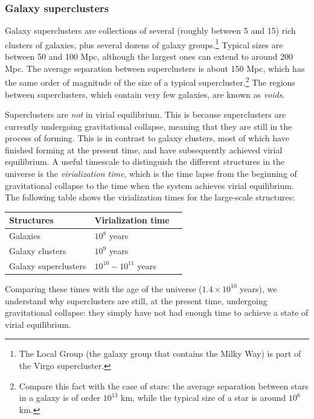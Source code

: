 \subsubsection{Galaxy superclusters}

Galaxy superclusters are collections of several (roughly between 5 and 15) rich clusters of galaxies, plus several dozens of galaxy groups.\footnote{The Local Group (the galaxy group that contains the Milky Way) is part of the Virgo supercluster.} Typical sizes are between 50 and 100 Mpc, although the largest ones can extend to around 200 Mpc. The average separation between superclusters is about 150 Mpc, which has the same order of magnitude of the size of a typical supercluster.\footnote{Compare this fact with the case of stars: the average separation between stars in a galaxy is of order $10^{13}$ km, while the typical size of a star is around $10^6$ km.} The regions between superclusters, which contain very few galaxies, are known as {\it voids}.

Superclusters are {\it not} in virial equilibrium. This is because superclusters are currently undergoing gravitational collapse, meaning that they are still in the process of forming. This is in contrast to galaxy clusters, most of which have finished forming at the present time, and have subsequently achieved virial equilibrium. A useful timescale to distinguish the different structures in the universe is the {\it virialization time}, which is the time lapse from the beginning of gravitational collapse to the time when the system achieves virial equilibrium. The following table shows the virialization times for the large-scale structures:
\begin{table}[ht]
\begin{center}
\begin{tabular}{p{5cm} l l} \hline\hline
Structures & Virialization time  \\ \hline
Galaxies & $10^8$ years \\
Galaxy clusters & $10^9$ years \\
Galaxy superclusters & $10^{10}-10^{11}$ years \\ \hline\hline
\end{tabular}
\end{center}
\end{table}

Comparing these times with the age of the universe ($1.4\times10^{10}$ years), we understand why superclusters are still, at the present time, undergoing gravitational collapse: they simply have not had enough time to achieve a state of virial equilibrium.

